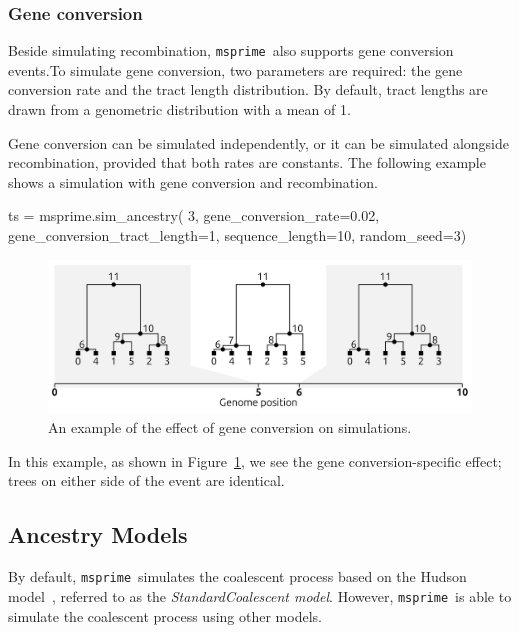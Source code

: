 \documentclass[graybox]{svmult}
\newcommand{\msprime}[0]{\texttt{msprime}}
\begin{document}
\subsubsection{Gene conversion}\label{gene-conversion}

Beside simulating recombination, \msprime\ also supports gene conversion events.To simulate gene conversion,
two parameters are required: the gene conversion rate and the tract length distribution. By default, tract lengths are drawn
from a genometric distribution with a mean of 1.

Gene conversion can be simulated independently, or it can be simulated alongside recombination, provided that both rates are constants.
The following example shows a simulation with gene conversion and recombination.

\begin{pythoncode}
ts = msprime.sim_ancestry(
    3, gene_conversion_rate=0.02, gene_conversion_tract_length=1,
    sequence_length=10, random_seed=3)
\end{pythoncode}

\begin{figure}
\begin{center}
\includegraphics[width=\textwidth]{images/gene_conversion.pdf}
\end{center}
\caption{\label{fig:gene_conversion} An example of the effect of gene conversion on simulations.}
\end{figure}

In this example, as shown in Figure~\ref{fig:gene_conversion}, we see the gene conversion-specific effect; trees on either side of the event are identical.

\subsection{Ancestry Models}\label{ancestry-models}

By default, \msprime\ simulates the coalescent process based on the Hudson model~\citep{hudson1983properties}, referred to as the
\emph{StandardCoalescent model}. However, \msprime\ is able to simulate the coalescent process using other models.
\end{document}
